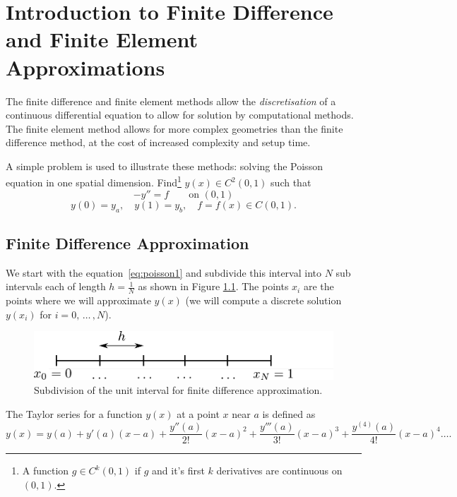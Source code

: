 \chapter{Introduction to Finite Difference and Finite Element Approximations}
\label{sec:intr-finite-ele-diff}

The finite difference and finite element methods allow the \emph{discretisation} of a continuous differential equation to allow for solution by computational methods. The finite element method allows for more complex geometries than the finite difference method, at the cost of increased complexity and setup time.

A simple problem is used to illustrate these methods: solving the Poisson
equation in one spatial dimension. Find\footnote{A function $g\in C^{k}(0,1)$ if $g$ and it's first $k$ derivatives are continuous on $(0,1)$.} $y(x)\in C^{2}(0,1)$ such that
\begin{equation}
  -y''=f\qquad\text{on }(0,1)
  \label{eq:poisson1}
\end{equation}
\begin{equation*}
  y(0)=y_{a},\quad y(1)=y_{b},\quad f=f(x)\in C(0,1).
\end{equation*}

\section{Finite Difference Approximation}
\label{sec:finite-diff-appr}

We start with the equation~\eqref{eq:poisson1} and subdivide this interval into
$N$ sub intervals each of length $h = \frac{1}{N}$ as shown in Figure
\ref{fig:The-subdivision}. The points $x_{i}$ are the points where we will
approximate $y(x)$ (\ie we will compute a discrete solution $y(x_{i})$ for
$i=0, \, \ldots \, ,N$).

\begin{figure}[!ht]
  \center
  \includegraphics[width=1\textwidth]{./images/finite_diff_discretisation}
  \caption{Subdivision of the unit interval for finite difference approximation.}
  \label{fig:The-subdivision}
\end{figure}

The Taylor series for a function $y(x)$ at a point $x$ near $a$
is defined as
\begin{equation*}
  y(x)=y(a)+y'(a)(x-a)+\dfrac{y''(a)}{2!}(x-a)^{2}
  + \dfrac{y'''(a)}{3!}(x-a)^{3}+\dfrac{y^{(4)}(a)}{4!}(x-a)^{4}\ldots.
\end{equation*}


